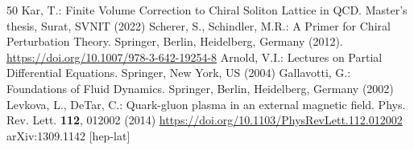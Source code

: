\begin{thebibliography}{50}
 Kar, T.: Finite Volume Correction to Chiral Soliton Lattice in QCD. Master's thesis, Surat, SVNIT (2022)
 Scherer, S., Schindler, M.R.: A Primer for Chiral Perturbation Theory. Springer, Berlin, Heidelberg, Germany (2012). \url{https://doi.org/10.1007/978-3-642-19254-8}
 Arnold, V.I.: Lectures on Partial Differential Equations. Springer, New York, US (2004)
 Gallavotti, G.: Foundations of Fluid Dynamics. Springer, Berlin, Heidelberg, Germany (2002)
 Levkova, L., DeTar, C.: Quark-gluon plasma in an external magnetic field. Phys. Rev. Lett. \textbf{112}, 012002 (2014) \url{https://doi.org/10.1103/PhysRevLett.112.012002} arXiv:1309.1142 [hep-lat]
\end{thebibliography}

